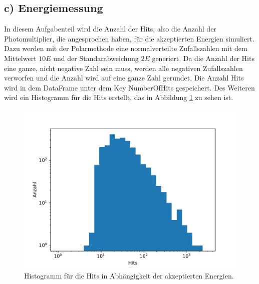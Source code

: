 \documentclass[a4paper, 11pt]{article}
\begin{document}
\FloatBarrier
\subsection*{c) Energiemessung}
In diesem Aufgabenteil wird die Anzahl der Hits, also die Anzahl der Photomultiplier,
die angesprochen haben, für die akzeptierten Energien simuliert.
Dazu werden mit der Polarmethode eine normalverteilte Zufallszahlen mit dem
Mittelwert $10 E$ und der Standarabweichung $2E$ generiert.
Da die Anzahl der
Hits eine ganze, nicht negative Zahl sein muss, werden alle negativen Zufallszahlen
verworfen und die Anzahl wird auf eine ganze Zahl gerundet. Die Anzahl Hits wird
in dem DataFrame unter dem Key NumberOfHits gespeichert. Des Weiteren wird ein
Histogramm für die Hits erstellt, das in Abbildung \ref{fig:hits} zu sehen ist.
\begin{figure}
  \centering
  \includegraphics[width=\textwidth]{../A11/Hits.pdf}
  \caption{Histogramm für die Hits in Abhängigkeit der akzeptierten Energien.}
  \label{fig:hits}
\end{figure}

\FloatBarrier
\end{document}
